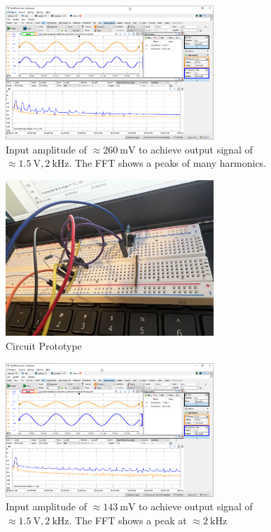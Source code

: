\documentclass{article}
\begin{document}
	\begin{figure}[H]
	    \centering
	    \includegraphics[width=0.7\textwidth]{w5a}
	    \caption{Input amplitude of $\approx \SI{260}{\milli\volt}$ to achieve output signal of $\approx \SI{1.5}{\volt}, \SI{2}{\kilo\hertz}$. The FFT shows a peaks of many harmonics.}
	\end{figure}
	
	\begin{figure}[H]
	    \centering
	    \includegraphics[width=0.7\textwidth]{photo-4}
	    \caption{Circuit Prototype}
	\end{figure}
	
	\begin{figure}[H]
	    \centering
	    \includegraphics[width=0.7\textwidth]{w5b}
	    \caption{Input amplitude of $\approx \SI{143}{\milli\volt}$ to achieve output signal of $\approx \SI{1.5}{\volt}, \SI{2}{\kilo\hertz}$. The FFT shows a peak at $\approx \SI{2}{\kilo\hertz}$ }
	\end{figure}
	
\end{document}
